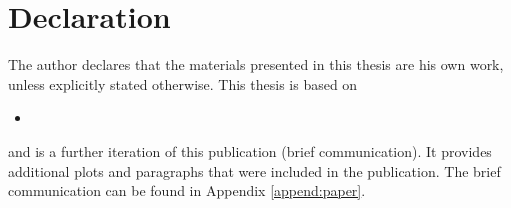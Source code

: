 \chapter*{Declaration}
\label{chap:declaration}

The author declares that the materials presented in this thesis are his own work, unless explicitly stated otherwise. This thesis is based on
\bigskip
\begin{itemize}
    \item [] 
\end{itemize}
\bigskip
and is a further iteration of this publication (brief communication). It provides additional plots and paragraphs that were included in the publication. The brief communication can be found in Appendix \ref{append:paper}.